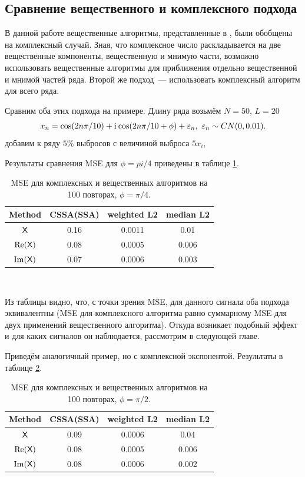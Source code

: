 \documentclass[specialist,
               substylefile = spbu.rtx,
               subf,href,colorlinks=true, 12pt]{disser}
\begin{document}
\subsection{Сравнение вещественного и комплексного подхода} \label{sec:comp}

В данной работе вещественные алгоритмы, представленные в \cite{Tretyakova20}, были обобщены на комплексный случай. Зная, что комплексное число раскладывается на две вещественные компоненты, вещественную и мнимую части, возможно использовать вещественные алгоритмы для приближения отдельно вещественной и мнимой частей ряда. Второй же подход~--- использовать комплексный алгоритм для всего ряда.

Сравним оба этих подхода на примере. 
Длину ряда возьмём $N = 50$, $L = 20$
$$x_n = \cos(2n\pi/10) + \mathrm{i}\mkern1mu\cos(2n\pi/10 + \phi) + \varepsilon_n, ~ \varepsilon_n \sim CN(0,0.01).$$
добавим к ряду $5\%$ выбросов с величиной выброса $5x_i$,

Результаты сравнения MSE для $\phi = pi / 4$ приведены в таблице \ref{tab:th_ex}.
\begin{table}[H]
	\caption{MSE для комплексных и вещественных алгоритмов на 100 повторах, $\phi = \pi / 4$.}
	\label{tab:th_ex}
	\begin{center}
		\begin{tabular}{|c|c|c|c|}
			\hline
			Method & CSSA(SSA) & weighted L2 & median L2\\ 
			\hline
			$\textsf{X}$ & 0.16 & 0.0011 & 0.01\\
			\hline
			$\Re(\textsf{X})$ & 0.08 & 0.0005 &   0.006\\
			\hline
			$\Im(\textsf{X})$ & 0.07   & 0.0006 &   0.003\\
			\hline
		\end{tabular} \\
	\end{center}
\end{table}

Из таблицы видно, что, с точки зрения MSE, для данного сигнала оба подхода эквивалентны (MSE для комплексного алгоритма равно суммарному MSE для двух применений вещественного алгоритма). Откуда возникает подобный эффект и для каких сигналов он наблюдается, рассмотрим в следующей главе.

Приведём аналогичный пример, но с комплексной экспонентой. Результаты в таблице \ref{tab:th_ex_exp}.

\begin{table}[H]
	\caption{MSE для комплексных и вещественных алгоритмов на 100 повторах, $\phi = \pi / 2$.}
	\label{tab:th_ex_exp}
	\begin{center}
		\begin{tabular}{|c|c|c|c|}
			\hline
			Method & CSSA(SSA) & weighted L2 & median L2 \\ 
			\hline
			$\textsf{X}$ & 0.09 & 0.0006 & 0.04\\
			\hline
			$\Re(\textsf{X})$ & 0.08 & 0.0005 &   0.006\\
			\hline
			$\Im(\textsf{X})$ & 0.08   & 0.0006 &   0.002\\
			\hline
		\end{tabular} \\
	\end{center}
\end{table}
\end{document}
